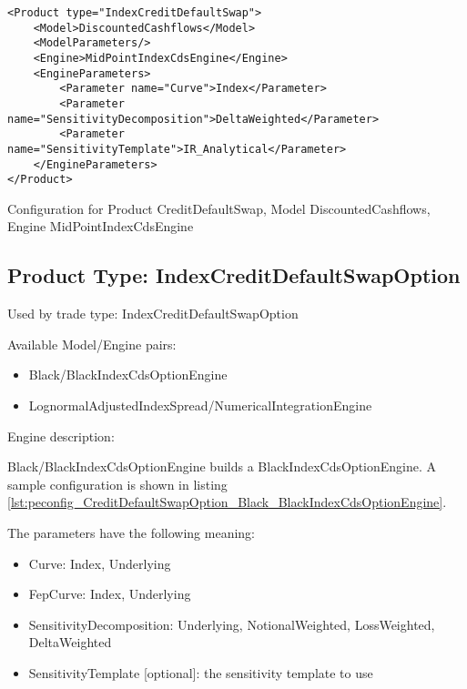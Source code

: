 \begin{longlisting}
\begin{verbatim}
<Product type="IndexCreditDefaultSwap">
    <Model>DiscountedCashflows</Model>
    <ModelParameters/>
    <Engine>MidPointIndexCdsEngine</Engine>
    <EngineParameters>
        <Parameter name="Curve">Index</Parameter>
        <Parameter name="SensitivityDecomposition">DeltaWeighted</Parameter>
        <Parameter name="SensitivityTemplate">IR_Analytical</Parameter>
    </EngineParameters>
</Product>
\end{verbatim}
\caption{Configuration for Product CreditDefaultSwap, Model DiscountedCashflows, Engine MidPointIndexCdsEngine}
\label{lst:peconfig_CreditDefaultSwap_DiscountedCashflows_MidPointIndexCdsEngine}
\end{longlisting}

\subsection{Product Type: IndexCreditDefaultSwapOption}

Used by trade type: IndexCreditDefaultSwapOption

Available Model/Engine pairs:

\begin{itemize}
\item Black/BlackIndexCdsOptionEngine
\item LognormalAdjustedIndexSpread/NumericalIntegrationEngine
\end{itemize}

Engine description:

Black/BlackIndexCdsOptionEngine builds a BlackIndexCdsOptionEngine. A sample configuration is shown in listing
\ref{lst:peconfig_CreditDefaultSwapOption_Black_BlackIndexCdsOptionEngine}.

The parameters have the following meaning:

\begin{itemize}
\item Curve: Index, Underlying
\item FepCurve: Index, Underlying
\item SensitivityDecomposition: Underlying, NotionalWeighted, LossWeighted, DeltaWeighted
\item SensitivityTemplate [optional]: the sensitivity template to use 
\end{itemize}

